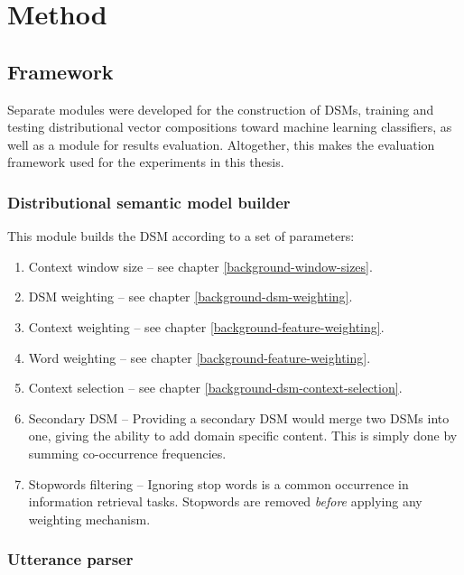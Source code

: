 \chapter{Method}\label{method}

\section{Framework}
\label{framework}

Separate modules were developed for the construction of DSMs, training and testing distributional vector compositions toward machine learning classifiers, as well as a module for results evaluation. Altogether, this makes the evaluation framework used for the experiments in this thesis.

\subsection{Distributional semantic model builder}
\label{sec:distributional_model_builder}

This module builds the DSM according to a set of parameters:

\begin{enumerate}
    \item Context window size -- see chapter \ref{background-window-sizes}.
    \item DSM weighting -- see chapter \ref{background-dsm-weighting}.
    \item Context weighting -- see chapter \ref{background-feature-weighting}.
    \item Word weighting -- see chapter \ref{background-feature-weighting}.
    \item Context selection -- see chapter \ref{background-dsm-context-selection}.
    \item Secondary DSM -- Providing a secondary DSM would merge two DSMs into one, giving the ability to add domain specific content. This is simply done by summing co-occurrence frequencies.
    \item Stopwords filtering -- Ignoring stop words is a common occurrence in information retrieval tasks. Stopwords are removed \emph{before} applying any weighting mechanism.
\end{enumerate}


\subsection{Utterance parser}
\label{sec:utterance_parser}


